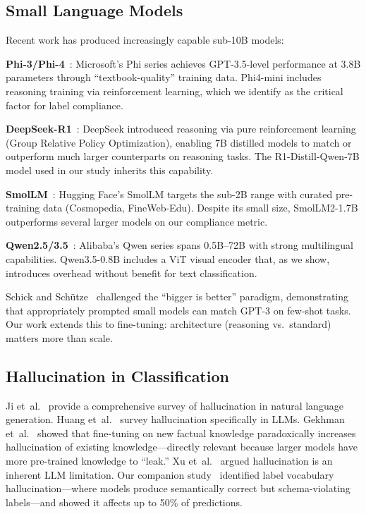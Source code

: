 \documentclass[review,3p]{elsarticle}
\begin{document}
\subsection{Small Language Models}
Recent work has produced increasingly capable sub-10B models:

\textbf{Phi-3/Phi-4}~\cite{abdin2024}: Microsoft's Phi series achieves GPT-3.5-level performance at 3.8B parameters through ``textbook-quality'' training data. Phi4-mini includes reasoning training via reinforcement learning, which we identify as the critical factor for label compliance.

\textbf{DeepSeek-R1}~\cite{guo2025}: DeepSeek introduced reasoning via pure reinforcement learning (Group Relative Policy Optimization), enabling 7B distilled models to match or outperform much larger counterparts on reasoning tasks. The R1-Distill-Qwen-7B model used in our study inherits this capability.

\textbf{SmolLM}~\cite{allal2024}: Hugging Face's SmolLM targets the sub-2B range with curated pre-training data (Cosmopedia, FineWeb-Edu). Despite its small size, SmolLM2-1.7B outperforms several larger models on our compliance metric.

\textbf{Qwen2.5/3.5}~\cite{yang2024}: Alibaba's Qwen series spans 0.5B--72B with strong multilingual capabilities. Qwen3.5-0.8B includes a ViT visual encoder that, as we show, introduces overhead without benefit for text classification.

Schick and Sch\"{u}tze~\cite{schick2021} challenged the ``bigger is better'' paradigm, demonstrating that appropriately prompted small models can match GPT-3 on few-shot tasks. Our work extends this to fine-tuning: architecture (reasoning vs.\ standard) matters more than scale.

\subsection{Hallucination in Classification}
Ji et~al.~\cite{ji2023} provide a comprehensive survey of hallucination in natural language generation. Huang et~al.~\cite{huang2023} survey hallucination specifically in LLMs. Gekhman et~al.~\cite{gekhman2024} showed that fine-tuning on new factual knowledge paradoxically increases hallucination of existing knowledge---directly relevant because larger models have more pre-trained knowledge to ``leak.'' Xu et~al.~\cite{xu2024} argued hallucination is an inherent LLM limitation. Our companion study~\cite{p3} identified label vocabulary hallucination---where models produce semantically correct but schema-violating labels---and showed it affects up to 50\% of predictions.
\end{document}
